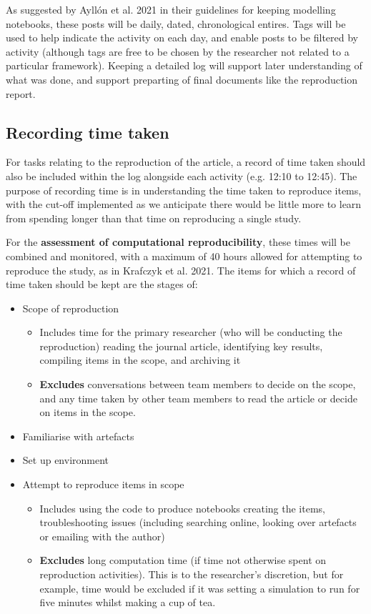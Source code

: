 As suggested by Ayllón et al. 2021\autocite{ayllon_keeping_2021} in their guidelines for keeping modelling notebooks, these posts will be daily, dated, chronological entires. Tags will be used to help indicate the activity on each day, and enable posts to be filtered by activity (although tags are free to be chosen by the researcher not related to a particular framework). Keeping a detailed log will support later understanding of what was done, and support preparting of final documents like the reproduction report.

\subsection{Recording time taken}

For tasks relating to the reproduction of the article, a record of time taken should also be included within the log alongside each activity (e.g. 12:10 to 12:45). The purpose of recording time is in understanding the time taken to reproduce items, with the cut-off implemented as we anticipate there would be little more to learn from spending longer than that time on reproducing a single study.

For the \textbf{assessment of computational reproducibility}, these times will be combined and monitored, with a maximum of 40 hours allowed for attempting to reproduce the study, as in Krafczyk et al. 2021.\autocite{krafczyk_learning_2021} The items for which a record of time taken should be kept are the stages of:
\begin{itemize}
    \item Scope of reproduction
    \begin{itemize}
        \item Includes time for the primary researcher (who will be conducting the reproduction) reading the journal article, identifying key results, compiling items in the scope, and archiving it
        \item \textbf{Excludes} conversations between team members to decide on the scope, and any time taken by other team members to read the article or decide on items in the scope.
    \end{itemize}
    \item Familiarise with artefacts
    \item Set up environment
    \item Attempt to reproduce items in scope
    \begin{itemize}
        \item Includes using the code to produce notebooks creating the items, troubleshooting issues (including searching online, looking over artefacts or emailing with the author)
        \item \textbf{Excludes} long computation time (if time not otherwise spent on reproduction activities). This is to the researcher's discretion, but for example, time would be excluded if it was setting a simulation to run for five minutes whilst making a cup of tea.
    \end{itemize}
\end{itemize}

